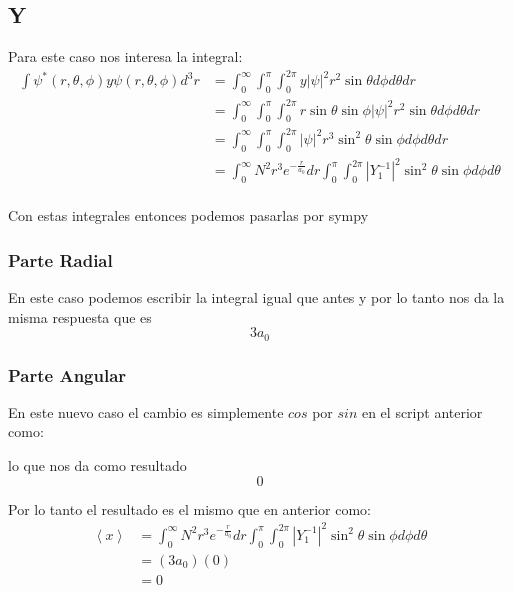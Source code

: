 \documentclass{report}
\begin{document}
\subsection{Y}

Para este caso nos interesa la integral:
\begin{align*}
	\int \psi^* \left( r, \theta, \phi \right)y \psi \left( r, \theta, \phi \right) d^3r &= \int_0^\infty \int_0^\pi \int_0^{2\pi} y \left| \psi \right|^2 r^2 \sin\theta d\phi d\theta dr\\
	&= \int_0^\infty \int_0^\pi \int_0^{2\pi} r\sin\theta\sin\phi \left| \psi \right|^2 r^2 \sin\theta d\phi d\theta dr\\
	&= \int_0^\infty \int_0^\pi \int_0^{2\pi} \left| \psi \right|^2 r^3 \sin^2\theta\sin\phi d\phi d\theta dr\\
	&= \int_0^\infty N^2 r^3 e^{-\frac{r}{a_0}} dr \int_0^\pi \int_0^{2\pi} \left| Y_1^{-1} \right|^2\sin^2\theta\sin\phi d\phi d\theta\\
\end{align*}

Con estas integrales entonces podemos pasarlas por sympy
\subsubsection{Parte Radial}
En este caso podemos escribir la integral igual que antes y por lo tanto nos da la misma respuesta que es \[
	3 a_0
\]

\subsubsection{Parte Angular}

En este nuevo caso el cambio es simplemente $cos$ por $sin$ en el script anterior como:


lo que nos da como resultado \[
	0
\]

Por lo tanto el resultado es el mismo que en anterior como:
\begin{align*}
	\left< x \right> &= \int_0^\infty N^2 r^3 e^{-\frac{r}{a_0}} dr \int_0^\pi \int_0^{2\pi} \left| Y_1^{-1} \right|^2\sin^2\theta\sin\phi d\phi d\theta\\
	&= \left( 3 a_0 \right) \left( 0 \right)\\
	&= 0
\end{align*}



\end{document}
